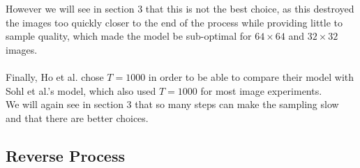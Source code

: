 \documentclass{article}
\begin{document}
However we will see in section 3 that this is not the best choice, as this destroyed the images too quickly closer to the end of the process while providing little to sample quality, which made the model be sub-optimal for $64 \times 64$ and $32 \times 32$ images. \cite{nichol2021improved}
\\\\
Finally, Ho et al. \cite{ho2020denoising} chose $T = 1000$ in order to be able to compare their model with Sohl et al.'s \cite{sohldickstein2015deep} model, which also used $T = 1000$ for most image experiments. \\
We will again see in section 3 that so many steps can make the sampling slow and that there are better choices. \cite{nichol2021improved}
\subsection{Reverse Process}
\end{document}
